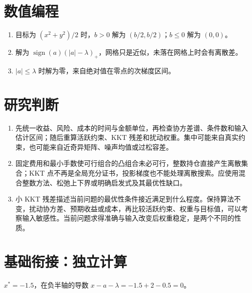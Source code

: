 \section*{数值编程}
\begin{enumerate}[leftmargin=*]
  \item 目标为 $(x^2+y^2)/2$ 时，$b>0$ 解为 $(b/2,b/2)$；$b\leq0$ 解为 $(0,0)$。
  \item 解为 $\operatorname{sign}(a)(|a|-\lambda)_+$，网格只是近似，未落在网格上时会有离散差。
  \item $|a|\leq\lambda$ 时解为零，来自绝对值在零点的次梯度区间。
\end{enumerate}

\section*{研究判断}
\begin{enumerate}[leftmargin=*,start=10]
\item 先统一收益、风险、成本的时间与金额单位，再检查协方差谱、条件数和输入估计区间；随后重算活跃约束、KKT 残差和扰动权重。集中可能来自真实约束，也可能来自近奇异矩阵、噪声均值或过松容差。
\item 固定费用和最小手数使可行组合的凸组合未必可行，整数持仓直接产生离散集合；KKT 点不再是全局充分证书，投影梯度也不能处理离散搜索。应使用混合整数方法、松弛上下界或明确启发式及其最优性缺口。
\item 小 KKT 残差描述当前问题的最优性条件接近满足到什么程度。保持算法不变，扰动协方差、预期收益或成本，再比较活跃约束、权重与目标值，可以考察输入敏感性。当前问题求得准确与输入改变后权重稳定，是两个不同的性质。
\end{enumerate}


\MFQMappedUpperThirteenSolutions


\section*{基础衔接：独立计算}
$x^*=-1.5$，在负半轴的导数 $x-a-\lambda=-1.5+2-0.5=0$。
